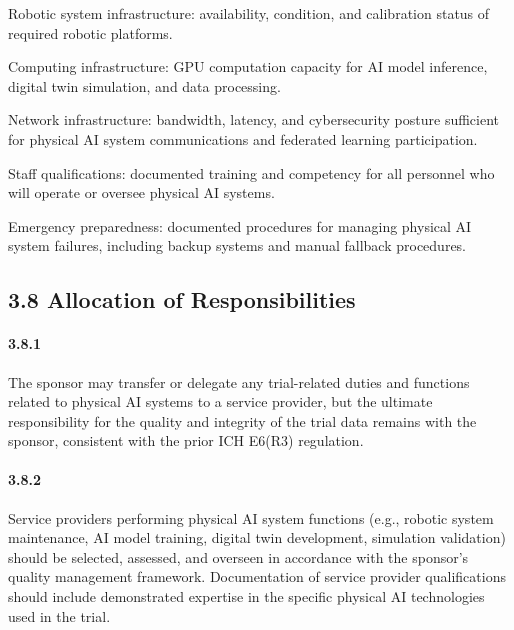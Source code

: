 \documentclass[11pt]{article}
\begin{document}
\begin{description}[leftmargin=2.5cm,style=sameline]

\item[(a)] Robotic system infrastructure: availability, condition, and calibration status of required robotic platforms.

\item[(b)] Computing infrastructure: GPU computation capacity for AI model inference, digital twin simulation, and data processing.

\item[(c)] Network infrastructure: bandwidth, latency, and cybersecurity posture sufficient for physical AI system communications and federated learning participation.

\item[(d)] Staff qualifications: documented training and competency for all personnel who will operate or oversee physical AI systems.

\item[(e)] Emergency preparedness: documented procedures for managing physical AI system failures, including backup systems and manual fallback procedures.

\end{description}

\subsection{3.8 Allocation of Responsibilities}

\paragraph{3.8.1} The sponsor may transfer or delegate any trial-related duties and functions related to physical AI systems to a service provider, but the ultimate responsibility for the quality and integrity of the trial data remains with the sponsor, consistent with the prior ICH E6(R3) regulation.

\paragraph{3.8.2} Service providers performing physical AI system functions (e.g., robotic system maintenance, AI model training, digital twin development, simulation validation) should be selected, assessed, and overseen in accordance with the sponsor's quality management framework. Documentation of service provider qualifications should include demonstrated expertise in the specific physical AI technologies used in the trial.
\end{document}
